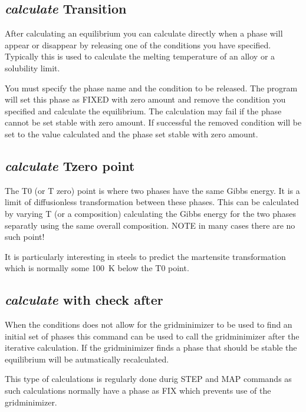 \documentclass[11pt]{article}
\begin{document}
\hypertarget{Calculate transform}{}
\subsection{{\em calculate} Transition}

After calculating an equilibrium you can calculate directly when a
phase will appear or disappear by releasing one of the conditions you
have specified.  Typically this is used to calculate the melting
temperature of an alloy or a solubility limit.  

You must specify the phase name and the condition to be released.  The
program will set this phase as FIXED with zero amount and remove the
condition you specified and calculate the equilibrium.  The
calculation may fail if the phase cannot be set stable with zero
amount.  If successful the removed condition will be set to the value
calculated and the phase set stable with zero amount.

\hypertarget{Tzero}{}
\subsection{{\em calculate} Tzero point}\label{sc:tzero2}

The T0 (or T zero) point is where two phases have the same Gibbs
energy.  It is a limit of diffusionless transformation between these
phases.  This can be calculated by varying T (or a composition)
calculating the Gibbs energy for the two phases separatly using the
same overall composition.  NOTE in many cases there are no such point!

It is particularly interesting in steels to predict the martensite
transformation which is normally some 100~K below the T0 point.

\hypertarget{Calculate with check}{}
\subsection{{\em calculate} with check after}

When the conditions does not allow for the gridminimizer to be used to
find an initial set of phases this command can be used to call the
gridminimizer after the iterative calculation.  If the gridminimizer
finds a phase that should be stable the equilibrium will be
autmatically recalculated.

This type of calculations is regularly done durig STEP and MAP
commands as such calculations normally have a phase as FIX which
prevents use of the gridminimizer.
\end{document}
